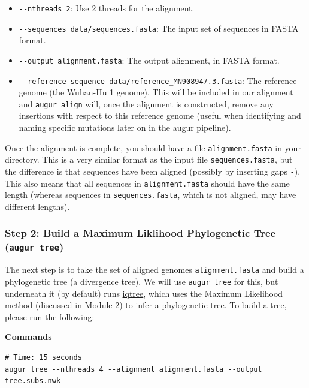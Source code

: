 \documentclass[
]{book}
\providecommand{\tightlist}{%
  \setlength{\itemsep}{0pt}\setlength{\parskip}{0pt}}
\begin{document}
\begin{itemize}
\tightlist
\item
  \texttt{-\/-nthreads\ 2}: Use 2 threads for the alignment.
\item
  \texttt{-\/-sequences\ data/sequences.fasta}: The input set of sequences in FASTA format.
\item
  \texttt{-\/-output\ alignment.fasta}: The output alignment, in FASTA format.
\item
  \texttt{-\/-reference-sequence\ data/reference\_MN908947.3.fasta}: The reference genome (the Wuhan-Hu 1 genome). This will be included in our alignment and \texttt{augur\ align} will, once the alignment is constructed, remove any insertions with respect to this reference genome (useful when identifying and naming specific mutations later on in the augur pipeline).
\end{itemize}

Once the alignment is complete, you should have a file \texttt{alignment.fasta} in your directory. This is a very similar format as the input file \texttt{sequences.fasta}, but the difference is that sequences have been aligned (possibly by inserting gaps \texttt{-}). This also means that all sequences in \texttt{alignment.fasta} should have the same length (whereas sequences in \texttt{sequences.fasta}, which is not aligned, may have different lengths).

\subsubsection{\texorpdfstring{Step 2: Build a Maximum Liklihood Phylogenetic Tree (\texttt{augur\ tree})}{Step 2: Build a Maximum Liklihood Phylogenetic Tree (augur tree)}}\label{step-2-build-a-maximum-liklihood-phylogenetic-tree-augur-tree}

The next step is to take the set of aligned genomes \texttt{alignment.fasta} and build a phylogenetic tree (a divergence tree). We will use \texttt{augur\ tree} for this, but underneath it (by default) runs \href{http://www.iqtree.org/}{iqtree}, which uses the Maximum Likelihood method (discussed in Module 2) to infer a phylogenetic tree. To build a tree, please run the following:

\textbf{Commands}

\begin{verbatim}
# Time: 15 seconds
augur tree --nthreads 4 --alignment alignment.fasta --output tree.subs.nwk
\end{verbatim}
\end{document}
